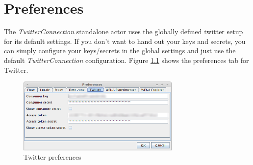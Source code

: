 \documentclass[a4paper]{book}
\begin{document}
\chapter{Preferences}
\label{preferences}
The \textit{TwitterConnection} standalone actor uses the globally defined
twitter setup for its default settings. If you don't want to hand out your
keys and secrets, you can simply configure your keys/secrets in the global
settings and just use the default \textit{TwitterConnection} configuration.
Figure \ref{twitter_preferences} shows the preferences tab for Twitter.
\begin{figure}[htb]
  \centering
  \includegraphics[width=8.0cm]{images/twitter_preferences.png}
  \caption{Twitter preferences}
  \label{twitter_preferences}
\end{figure}


\end{document}
